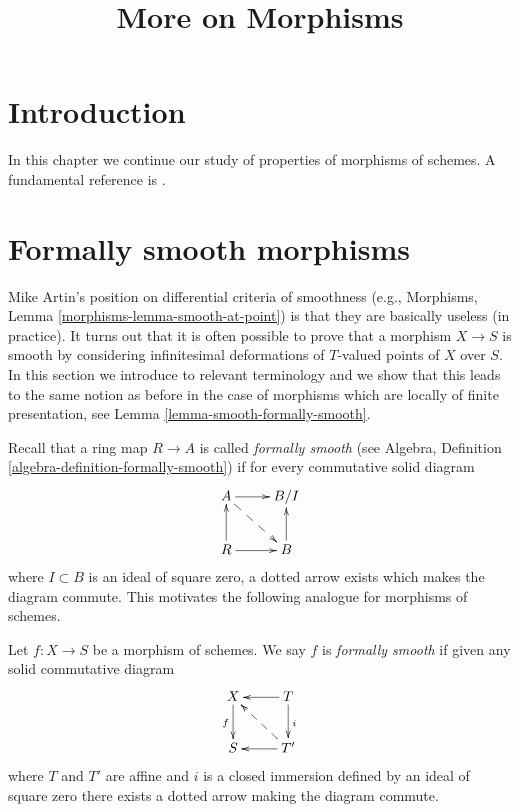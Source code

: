 

%


\title{More on Morphisms}


\maketitle

\label{section-phantom}

\tableofcontents

\section{Introduction}
\label{section-introduction}

\noindent
In this chapter we continue our study of properties of morphisms of schemes.
A fundamental reference is \cite{EGA}.









\section{Formally smooth morphisms}
\label{section-formally-smooth}

\noindent
Mike Artin's position on differential criteria of smoothness (e.g.,
Morphisms, Lemma \ref{morphisms-lemma-smooth-at-point}) is that they are
basically useless (in practice). It turns out that it is
often possible to prove that a morphism $X \to S$ is smooth by considering
infinitesimal deformations of $T$-valued points of $X$ over $S$. In this
section we introduce to relevant terminology and we show that this leads
to the same notion as before in the case of morphisms which are locally
of finite presentation, see Lemma \ref{lemma-smooth-formally-smooth}.

\medskip\noindent
Recall that a ring map $R \to A$ is called {\it formally smooth}
(see Algebra, Definition \ref{algebra-definition-formally-smooth})
if for every commutative solid diagram
$$
\xymatrix{
A \ar[r] \ar@{-->}[rd] & B/I \\
R \ar[r] \ar[u] & B \ar[u]
}
$$
where $I \subset B$ is an ideal of square zero, a dotted
arrow exists which makes the diagram commute. This motivates
the following analogue for morphisms of schemes.

\begin{definition}
\label{definition-formally-smooth}
Let $f : X \to S$ be a morphism of schemes.
We say $f$ is {\it formally smooth} if given any solid commutative diagram
$$
\xymatrix{
X \ar[d]_f & T \ar[d]^i \ar[l] \\
S & T' \ar[l] \ar@{-->}[lu]
}
$$
where $T$ and $T'$ are affine and $i$ is a closed immersion defined
by an ideal of square zero there exists a dotted arrow making the diagram
commute.
\end{definition}

